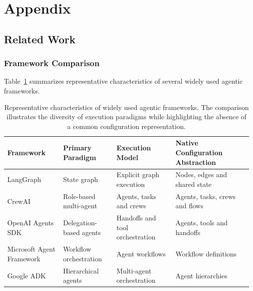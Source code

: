 \documentclass[10pt]{article}
\begin{document}
\appendices
\section{Appendix}
\label{appendix}
\subsection{Related Work}
\label{appendix:related_work}
\subsubsection{Framework Comparison}
Table~\ref{tab:framework_comparison} summarizes representative characteristics of several widely used agentic frameworks.
\begin{table}[t]
	\centering
	\caption{Representative characteristics of widely used agentic frameworks. The comparison illustrates the diversity of execution paradigms while highlighting the absence of a common configuration representation.}
	\label{tab:framework_comparison}
	
	\renewcommand{\arraystretch}{1.15}
	
	\begin{tabular}{p{3.2cm}p{3.1cm}p{3.4cm}p{3.4cm}c}
		\toprule
		\textbf{Framework}
		&
		\textbf{Primary Paradigm}
		&
		\textbf{Execution Model}
		&
		\textbf{Native Configuration Abstraction}
		\\
		\midrule
		
		LangGraph
		&
		State graph
		&
		Explicit graph execution
		&
		Nodes, edges and shared state
		\\
		
		CrewAI
		&
		Role-based multi-agent
		&
		Agents, tasks and crews
		&
		Agents, tasks, crews and flows
		\\
		
		OpenAI Agents SDK
		&
		Delegation-based agents
		&
		Handoffs and tool orchestration
		&
		Agents, tools and handoffs
		\\
		
		Microsoft Agent Framework
		&
		Workflow orchestration
		&
		Agent workflows
		&
		Workflow definitions
		\\
		
		Google ADK
		&
		Hierarchical agents
		&
		Multi-agent orchestration
		&
		Agent hierarchies
		\\
		
		\bottomrule
	\end{tabular}
	
\end{table}
\end{document}
